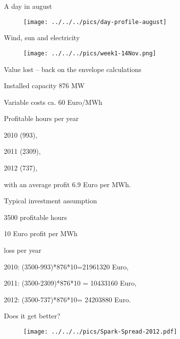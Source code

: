 {A day in august}
\begin{figure}[htp]
\centering
\texttt{[image: ../../../pics/day-profile-august]}
\end{figure}

{Wind, sun and electricity}
\begin{figure}[htp]
\centering
\texttt{[image: ../../../pics/week1-14Nov.png]}
\end{figure}

{Value lost -- back on the envelope calculations}






	Installed capacity 876 MW


	Variable costs ca. 60 Euro/MWh


	Profitable hours per year






	2010 (993),


	2011 (2309),


	2012 (737),




with an average profit 6.9 Euro per MWh.


	Typical investment assumption






	3500 profitable hours


	10 Euro profit per MWh






	loss per year






	2010: (3500-993)*876*10=21961320 Euro,


	2011:  (3500-2309)*876*10 = 10433160 Euro,


	2012: (3500-737)*876*10= 24203880 Euro.











{Does it get better?}
\begin{figure}[htp]
\centering
\texttt{[image: ../../../pics/Spark-Spread-2012.pdf]}
\end{figure}

